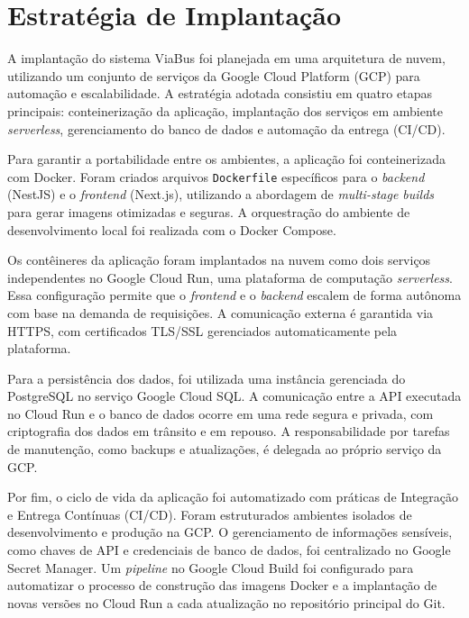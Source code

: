 \section{Estratégia de Implantação}

A implantação do sistema ViaBus foi planejada em uma arquitetura de nuvem, utilizando um conjunto de serviços da Google Cloud Platform (GCP) para automação e escalabilidade. A estratégia adotada consistiu em quatro etapas principais: conteinerização da aplicação, implantação dos serviços em ambiente \textit{serverless}, gerenciamento do banco de dados e automação da entrega (CI/CD).

Para garantir a portabilidade entre os ambientes, a aplicação foi conteinerizada com Docker. Foram criados arquivos \texttt{Dockerfile} específicos para o \textit{backend} (NestJS) e o \textit{frontend} (Next.js), utilizando a abordagem de \textit{multi-stage builds} para gerar imagens otimizadas e seguras. A orquestração do ambiente de desenvolvimento local foi realizada com o Docker Compose.

Os contêineres da aplicação foram implantados na nuvem como dois serviços independentes no Google Cloud Run, uma plataforma de computação \textit{serverless}. Essa configuração permite que o \textit{frontend} e o \textit{backend} escalem de forma autônoma com base na demanda de requisições. A comunicação externa é garantida via HTTPS, com certificados TLS/SSL gerenciados automaticamente pela plataforma.

Para a persistência dos dados, foi utilizada uma instância gerenciada do PostgreSQL no serviço Google Cloud SQL. A comunicação entre a API executada no Cloud Run e o banco de dados ocorre em uma rede segura e privada, com criptografia dos dados em trânsito e em repouso. A responsabilidade por tarefas de manutenção, como backups e atualizações, é delegada ao próprio serviço da GCP.

Por fim, o ciclo de vida da aplicação foi automatizado com práticas de Integração e Entrega Contínuas (CI/CD). Foram estruturados ambientes isolados de desenvolvimento e produção na GCP. O gerenciamento de informações sensíveis, como chaves de API e credenciais de banco de dados, foi centralizado no Google Secret Manager. Um \textit{pipeline} no Google Cloud Build foi configurado para automatizar o processo de construção das imagens Docker e a implantação de novas versões no Cloud Run a cada atualização no repositório principal do Git.